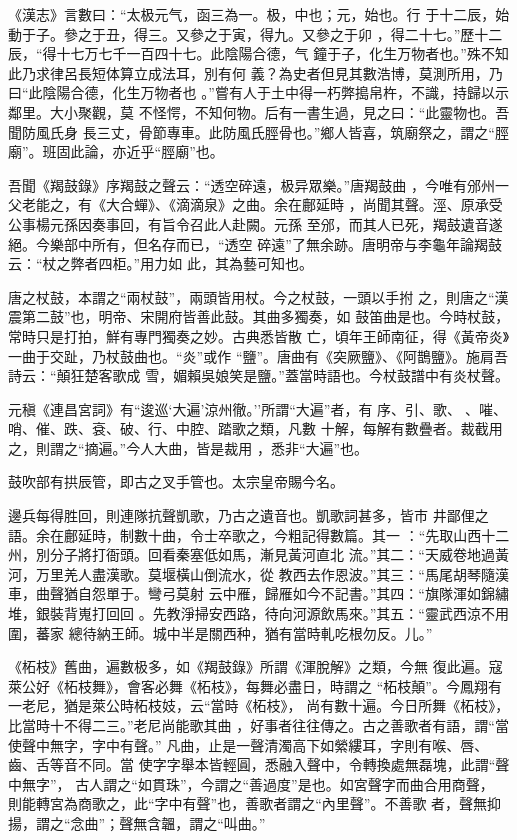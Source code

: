 \documentclass{ctexart}
\begin{document}
《漢志》言數曰：``太极元气，函三為一。极，中也；元，始也。行 于十二辰，始動于子。參之于丑，得三。又參之于寅，得九。又參之于卯 ，得二十七。''歷十二辰，``得十七万七千一百四十七。此陰陽合德，气 鐘于子，化生万物者也。''殊不知此乃求律呂長短体算立成法耳，別有何 義？為史者但見其數浩博，莫測所用，乃曰``此陰陽合德，化生万物者也 。''嘗有人于土中得一朽弊搗帛杵，不識，持歸以示鄰里。大小聚觀，莫 不怪愕，不知何物。后有一書生過，見之曰：``此靈物也。吾聞防風氏身 長三丈，骨節專車。此防風氏脛骨也。''鄉人皆喜，筑廟祭之，謂之``脛 廟''。班固此論，亦近乎``脛廟''也。

吾聞《羯鼓錄》序羯鼓之聲云：``透空碎遠，极异眾樂。''唐羯鼓曲 ，今唯有邠州一父老能之，有《大合蟬》、《滴滴泉》之曲。余在鄜延時 ，尚聞其聲。涇、原承受公事楊元孫因奏事回，有旨令召此人赴闕。元孫 至邠，而其人已死，羯鼓遺音遂絕。今樂部中所有，但名存而已，``透空 碎遠''了無余跡。唐明帝与李龜年論羯鼓云：``杖之弊者四柜。''用力如 此，其為藝可知也。

唐之杖鼓，本謂之``兩杖鼓''，兩頭皆用杖。今之杖鼓，一頭以手拊 之，則唐之``漢震第二鼓''也，明帝、宋開府皆善此鼓。其曲多獨奏，如 鼓笛曲是也。今時杖鼓，常時只是打拍，鮮有專門獨奏之妙。古典悉皆散 亡，頃年王師南征，得《黃帝炎》一曲于交趾，乃杖鼓曲也。``炎''或作 ``鹽''。唐曲有《突厥鹽》、《阿鵲鹽》。施肩吾詩云：``顛狂楚客歌成 雪，媚賴吳娘笑是鹽。''蓋當時語也。今杖鼓譜中有炎杖聲。

元稹《連昌宮詞》有``逡巡`大遍'涼州徹。''所謂``大遍''者，有 序、引、歌、、嗺、哨、催、跌、袞、破、行、中腔、踏歌之類，凡數 十解，每解有數疊者。裁截用之，則謂之``摘遍。''今人大曲，皆是裁用 ，悉非``大遍''也。

鼓吹部有拱辰管，即古之叉手管也。太宗皇帝賜今名。

邊兵每得胜回，則連隊抗聲凱歌，乃古之遺音也。凱歌詞甚多，皆市 井鄙俚之語。余在鄜延時，制數十曲，令士卒歌之，今粗記得數篇。其一 ：``先取山西十二州，別分子將打衙頭。回看秦塞低如馬，漸見黃河直北 流。''其二：``天威卷地過黃河，万里羌人盡漢歌。莫堰橫山倒流水，從 教西去作恩波。''其三：``馬尾胡琴隨漢車，曲聲猶自怨單于。彎弓莫射 云中雁，歸雁如今不記書。''其四：``旗隊渾如錦繡堆，銀裝背嵬打回回 。先教淨掃安西路，待向河源飲馬來。''其五：``靈武西涼不用圍，蕃家 總待納王師。城中半是關西种，猶有當時軋吃根勿反。儿。''

《柘枝》舊曲，遍數极多，如《羯鼓錄》所謂《渾脫解》之類，今無 復此遍。寇萊公好《柘枝舞》，會客必舞《柘枝》，每舞必盡日，時謂之 ``柘枝顛''。今鳳翔有一老尼，猶是萊公時柘枝妓，云``當時《柘枝》， 尚有數十遍。今日所舞《柘枝》，比當時十不得二三。''老尼尚能歌其曲 ，好事者往往傳之。古之善歌者有語，謂``當使聲中無字，字中有聲。'' 凡曲，止是一聲清濁高下如縈縷耳，字則有喉、唇、齒、舌等音不同。當 使字字舉本皆輕圓，悉融入聲中，令轉換處無磊塊，此謂``聲中無字''， 古人謂之``如貫珠''，今謂之``善過度''是也。如宮聲字而曲合用商聲， 則能轉宮為商歌之，此``字中有聲''也，善歌者謂之``內里聲''。不善歌 者，聲無抑揚，謂之``念曲''；聲無含韞，謂之``叫曲。''
\end{document}
